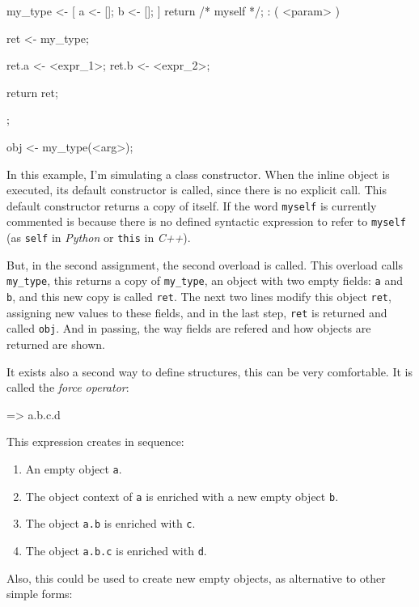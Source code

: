 \documentclass{article}
\begin{document}
\begin{faupp2}
  my_type <- [
                a <- [];
                b <- [];
             ] { return /* myself */; }
               : ( <param> )
               {
                 ret <- my_type;

                 ret.a <- <expr_1>;
                 ret.b <- <expr_2>;

                 return ret;
               };

   obj <- my_type(<arg>);
\end{faupp2}

In this example, I'm simulating a class constructor. When the inline object is
executed, its default constructor is called, since there is no explicit
call. This default constructor returns a copy of itself. If the word
\texttt{myself} is currently commented is because there is no defined syntactic
expression to refer to \texttt{myself} (as \texttt{self} in \textit{Python} or
\texttt{this} in \textit{C++}).

But, in the second assignment, the second overload is called. This overload
calls \texttt{my\_type}, this returns a copy of \texttt{my\_type}, an object
with two empty fields: \texttt{a} and \texttt{b}, and this new copy is called
\texttt{ret}. The next two lines modify this object \texttt{ret}, assigning
new values to these fields, and in the last step, \texttt{ret} is returned and
called \texttt{obj}. And in passing, the way fields are refered and how objects
are returned are shown.

It exists also a second way to define structures, this can be very
comfortable. It is called the \textit{force operator}:

\begin{faupp2}
  => a.b.c.d
\end{faupp2}

This expression creates in sequence:

\begin{enumerate}
\item An empty object \texttt{a}.
\item The object context of \texttt{a} is enriched with a new empty object
  \texttt{b}.
\item The object \texttt{a.b} is enriched with \texttt{c}.
\item The object \texttt{a.b.c} is enriched with \texttt{d}.
\end{enumerate}

Also, this could be used to create new empty objects, as alternative to other
simple forms:
\end{document}
